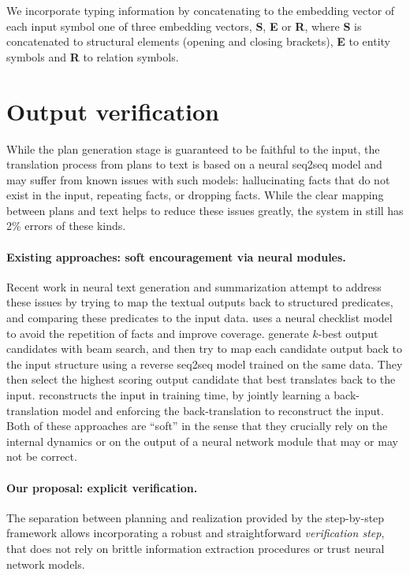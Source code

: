\documentclass[11pt,a4paper,table,xcdraw]{article}
\begin{document}
We incorporate typing information by concatenating to the embedding vector of each input symbol one of three embedding vectors, \textbf{S}, \textbf{E} or \textbf{R}, where \textbf{S} is concatenated to structural elements (opening and closing brackets), \textbf{E} to entity symbols and \textbf{R} to relation symbols. 

\section{Output verification}
\label{sec:rerank}
While the plan generation stage is guaranteed to be faithful to the input, the translation process from plans to text is based on a neural seq2seq model and may suffer from known issues with such models: hallucinating facts that do not exist in the input, repeating facts, or dropping facts. While the clear mapping between plans and text helps to reduce these issues greatly, the system in \citet{step-by-step} still has 2\% errors of these kinds.

\paragraph{Existing approaches: soft encouragement via neural modules.} Recent work in neural text generation and summarization attempt to address these issues by trying to map the textual outputs back to structured predicates, and comparing these predicates to the input data. \citet{kiddon2016globally} uses a neural checklist model to avoid the repetition of facts and improve coverage. \citet{agarwal2018char2char} generate $k$-best output candidates with beam search, and then try to map each candidate output back to the input structure using a reverse seq2seq model trained on the same data. They then select  the highest scoring output candidate that best translates back to the input. \citet{mohiuddin2019revisiting} reconstructs the input in training time, by jointly learning a back-translation model and enforcing the back-translation to reconstruct the input. 
Both of these approaches are ``soft'' in the sense that they crucially rely on the internal dynamics or on the output of a neural network module that may or may not be correct.

\paragraph{Our proposal: explicit verification.} The separation between planning and realization provided by the step-by-step framework allows incorporating a robust and straightforward \emph{verification step}, that does not rely on brittle information extraction procedures or trust neural network models. 
\end{document}

